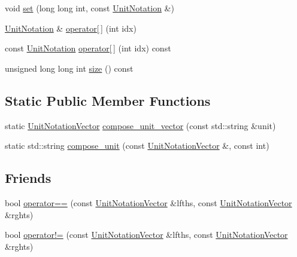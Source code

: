 \begin{DoxyCompactItemize}
\item 
void \hyperlink{classmunits_1_1_unit_notation_vector_acf4c47adb5dc13aec33ed7490516ff78}{set} (long long int, const \hyperlink{classmunits_1_1_unit_notation}{Unit\+Notation} \&)
\item 
\hyperlink{classmunits_1_1_unit_notation}{Unit\+Notation} \& \hyperlink{classmunits_1_1_unit_notation_vector_a9e70a631b3d5668f8c4569f31e0d7c8a}{operator\mbox{[}$\,$\mbox{]}} (int idx)
\item 
const \hyperlink{classmunits_1_1_unit_notation}{Unit\+Notation} \hyperlink{classmunits_1_1_unit_notation_vector_acdfb3a793a5f5fa2cf7a581cfdd3f952}{operator\mbox{[}$\,$\mbox{]}} (int idx) const
\item 
unsigned long long int \hyperlink{classmunits_1_1_unit_notation_vector_a80c7129293ee31c1f32db5f93a314f2c}{size} () const
\end{DoxyCompactItemize}
\subsection*{Static Public Member Functions}
\begin{DoxyCompactItemize}
\item 
static \hyperlink{classmunits_1_1_unit_notation_vector}{Unit\+Notation\+Vector} \hyperlink{classmunits_1_1_unit_notation_vector_a847223f35564205ba30737acf71464e1}{compose\+\_\+unit\+\_\+vector} (const std\+::string \&unit)
\item 
static std\+::string \hyperlink{classmunits_1_1_unit_notation_vector_a8d21171d845542dc43aae9b054d0c923}{compose\+\_\+unit} (const \hyperlink{classmunits_1_1_unit_notation_vector}{Unit\+Notation\+Vector} \&, const int)
\end{DoxyCompactItemize}
\subsection*{Friends}
\begin{DoxyCompactItemize}
\item 
bool \hyperlink{classmunits_1_1_unit_notation_vector_a3deb157e5ea66e135e7f7e2f7f3e34f7}{operator==} (const \hyperlink{classmunits_1_1_unit_notation_vector}{Unit\+Notation\+Vector} \&lfths, const \hyperlink{classmunits_1_1_unit_notation_vector}{Unit\+Notation\+Vector} \&rghts)
\item 
bool \hyperlink{classmunits_1_1_unit_notation_vector_a03faade4ba752fe916a9ed3f569ca308}{operator!=} (const \hyperlink{classmunits_1_1_unit_notation_vector}{Unit\+Notation\+Vector} \&lfths, const \hyperlink{classmunits_1_1_unit_notation_vector}{Unit\+Notation\+Vector} \&rghts)
\end{DoxyCompactItemize}


